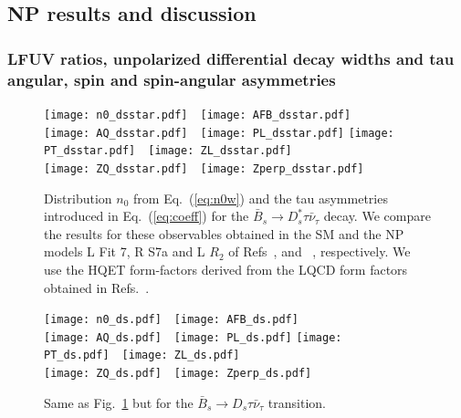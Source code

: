 \documentclass[aps,superscriptaddress,showpacs,nofootinbib,11pt]{revtex4-1}
\begin{document}
\subsection{NP results and discussion}
%
\subsubsection{LFUV ratios, unpolarized differential decay widths and  tau angular, spin and spin-angular asymmetries} 
\begin{figure}
\begin{center}
\texttt{[image: n0\_dsstar.pdf]}\ \ 
\texttt{[image: AFB\_dsstar.pdf]}\\ 
\texttt{[image: AQ\_dsstar.pdf]}\ \ \texttt{[image: PL\_dsstar.pdf]}
\texttt{[image: PT\_dsstar.pdf]}\ \ \texttt{[image: ZL\_dsstar.pdf]}\\
\texttt{[image: ZQ\_dsstar.pdf]}\  \ \texttt{[image: Zperp\_dsstar.pdf]}
\caption{ Distribution $n_0$ from Eq.~(\ref{eq:n0w}) and the tau asymmetries
introduced in Eq.~(\ref{eq:coeff}) for the $\bar B_s\to D^*_s\tau\bar\nu_\tau$ decay. We compare the results for these observables obtained in the SM and  the NP models L Fit 7, R S7a and
L $R_2$ of Refs~\cite{Murgui:2019czp}, \cite{Mandal:2020htr} and ~\cite{Shi:2019gxi}, respectively. We use the HQET form-factors derived from the LQCD form factors obtained in Refs.~\cite{Harrison:2023dzh,McLean:2019qcx}. }
\label{fig:dsstarasi}
\end{center}
\end{figure}

\begin{figure}
\begin{center}
\texttt{[image: n0\_ds.pdf]}\ \ 
\texttt{[image: AFB\_ds.pdf]}\\ 
\texttt{[image: AQ\_ds.pdf]}\ \ \texttt{[image: PL\_ds.pdf]}
\texttt{[image: PT\_ds.pdf]}\ \ \texttt{[image: ZL\_ds.pdf]}\\
\texttt{[image: ZQ\_ds.pdf]}\  \ \texttt{[image: Zperp\_ds.pdf]}
\caption{ Same as Fig.~\ref{fig:dsstarasi}  but for the $\bar B_s\to D_s\tau\bar\nu_\tau$ transition.}
\label{fig:dsasi}
\end{center}
\end{figure}
\end{document}
